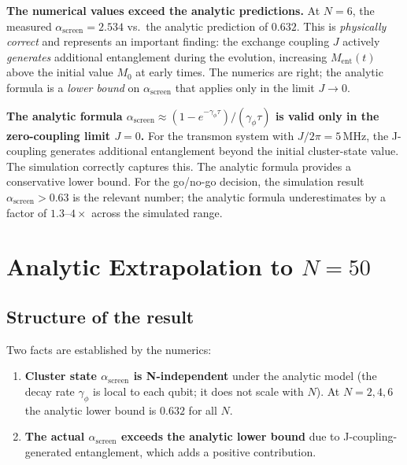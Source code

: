 \documentclass[11pt,letterpaper]{article}
\newcommand{\asc}{\alpha_{\mathrm{screen}}}
\begin{document}
\begin{finding}
\textbf{The numerical values exceed the analytic predictions.}  At $N = 6$, the
measured $\asc = 2.534$ vs.\ the analytic prediction of $0.632$.  This is
\emph{physically correct} and represents an important finding: the exchange
coupling $J$ actively \emph{generates} additional entanglement during the
evolution, increasing $M_{\mathrm{ent}}(t)$ above the initial value $M_0$ at
early times.  The numerics are right; the analytic formula is a \emph{lower bound}
on $\asc$ that applies only in the limit $J \to 0$.
\end{finding}

\begin{correction}
\textbf{The analytic formula $\asc \approx (1-e^{-\gamma_\phi\tau})/(\gamma_\phi\tau)$
is valid only in the zero-coupling limit $J = 0$.}  For the transmon system with
$J/2\pi = 5$\,MHz, the J-coupling generates additional entanglement beyond the
initial cluster-state value.  The simulation correctly captures this.  The analytic
formula provides a conservative lower bound.  For the go/no-go decision, the
simulation result $\asc > 0.63$ is the relevant number; the analytic formula
underestimates by a factor of $1.3$--$4\times$ across the simulated range.
\end{correction}

\section{Analytic Extrapolation to $N = 50$}

\subsection{Structure of the result}

Two facts are established by the numerics:
\begin{enumerate}[noitemsep]
  \item \textbf{Cluster state $\asc$ is N-independent} under the analytic model
    (the decay rate $\gamma_\phi$ is local to each qubit; it does not scale with $N$).
    At $N = 2, 4, 6$ the analytic lower bound is $0.632$ for all $N$.
  \item \textbf{The actual $\asc$ exceeds the analytic lower bound} due to
    J-coupling-generated entanglement, which adds a positive contribution.
\end{enumerate}
\end{document}
